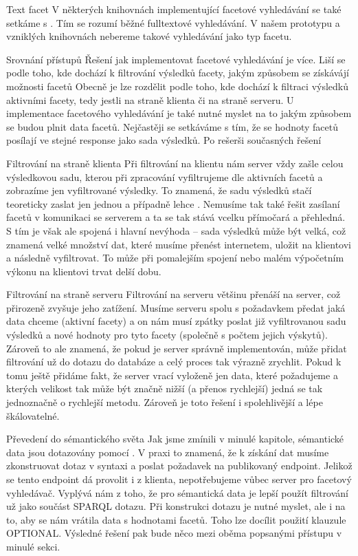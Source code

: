   \secc Text facet
  V některých knihovnách implementující facetové vyhledávání se také setkáme s . 
  Tím se rozumí běžné fulltextové vyhledávání. 
  V našem prototypu a vzniklých knihovnách nebereme takové vyhledávání jako typ facetu.
		
\sec Srovnání přístupů
Řešení jak implementovat facetové vyhledávání je více. 
Liší se podle toho, kde dochází k filtrování výsledků facety, jakým způsobem se získávájí možnosti facetů 
Obecně je lze rozdělit podle toho, kde dochází k filtraci výsledků aktivními facety, tedy jestli na straně klienta či na straně serveru.
U implementace facetového vyhledávání je také nutné myslet na to jakým způsobem se budou plnit data facetů. Nejčastěji se setkáváme s tím, že se
hodnoty facetů posílají ve stejné response jako sada výsledků. 
Po rešerši současných řešení

  \secc Filtrování na straně klienta
  Při filtrování na klientu nám server vždy zašle celou výsledkovou sadu, kterou při zpracování vyfiltrujeme dle aktivních facetů a zobrazíme jen vyfiltrované výsledky.
  To znamená, že sadu výsledků stačí teoreticky zaslat jen jednou a případně lehce .
  Nemusíme tak také řešit zasílaní facetů v komunikaci se serverem a ta se tak stává vcelku přímočará a přehledná.
  S tím je však ale spojená i hlavní nevýhoda – sada výsledků může být velká, což znamená velké množství dat, které musíme přenést internetem, uložit na klientovi a následně vyfiltrovat.
  To může při pomalejším spojení nebo malém výpočetním výkonu na klientovi trvat delší dobu. 

  \secc Filtrování na straně serveru
  Filtrování na serveru většinu  přenáší na server, což přirozeně zvyšuje jeho zatížení.
  Musíme serveru spolu s požadavkem předat jaká data chceme (aktivní facety) a on nám musí zpátky poslat již vyfiltrovanou sadu výsledků a nové hodnoty pro tyto facety (společně s počtem jejich výskytů).
  Zároveň to ale znamená, že pokud je server správně implementován, může přidat filtrování už do dotazu do databáze a celý proces tak výrazně zrychlit.
  Pokud k tomu ještě přidáme fakt, že server vrací vyloženě jen data, které požadujeme a kterých velikost tak může být značně nižší (a přenos rychlejší) jedná se tak jednoznačně o rychlejší metodu.
  Zároveň je toto řešení i spolehlivější a lépe škálovatelné.
	
\sec Převedení do sémantického světa
Jak jsme zmínili v minulé kapitole, sémantické data jsou dotazovány pomocí . 
V praxi to znamená, že k získání dat musíme zkonstruovat dotaz v syntaxi  a poslat požadavek na publikovaný  endpoint.
Jelikož se tento endpoint dá provolit i z klienta, nepotřebujeme vůbec server pro facetový vyhledávač.
Vyplývá nám z toho, že pro sémantická data je lepší použít filtrování už jako součást SPARQL dotazu.
Při konstrukci dotazu je nutné myslet, ale i na to, aby se nám vrátila data s hodnotami facetů. 
Toho lze docílit použití klauzule OPTIONAL.
Výsledné řešení pak bude něco mezi oběma popsanými přístupu v minulé sekci.
